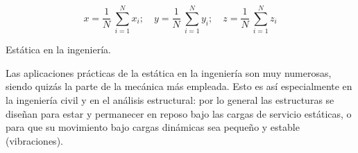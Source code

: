 $$ x= \dfrac 1 N \ \sum_{i=1}^N x_i; \quad y= \dfrac 1 N \ \sum_{i=1}^N y_i; \quad z= \dfrac 1 N \ \sum_{i=1}^N z_i$$




\vspace{20mm} %

\begin{myblock}{Estática en la ingeniería.}

Las aplicaciones prácticas de la estática en la ingeniería son muy numerosas, siendo quizás la parte de la mecánica más empleada. Esto es así especialmente en la ingeniería civil y en el análisis estructural: por lo general las estructuras se diseñan para estar y permanecer en reposo bajo las cargas de servicio estáticas, o para que su movimiento bajo cargas dinámicas sea pequeño y estable (vibraciones).
	
\end{myblock}



